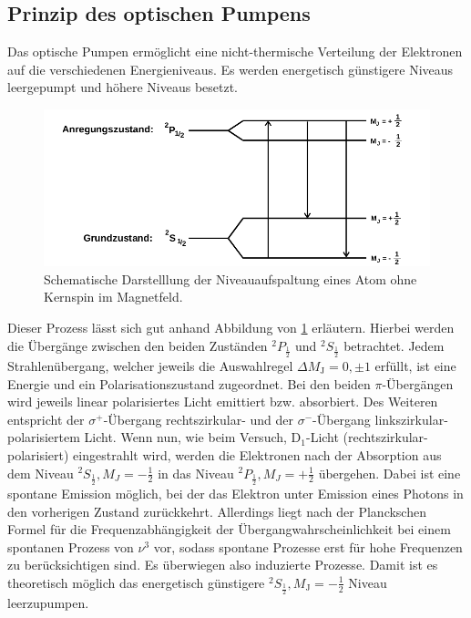 \subsection{Prinzip des optischen Pumpens}
Das optische Pumpen ermöglicht eine nicht-thermische Verteilung der
Elektronen auf die verschiedenen Energieniveaus. Es werden energetisch
günstigere Niveaus leergepumpt und höhere Niveaus besetzt.
\begin{figure}
  \centering
  \includegraphics[width=0.9\columnwidth]{pictures/niveaus.png}
  \caption{Schematische Darstelllung der Niveauaufspaltung eines Atom ohne Kernspin im Magnetfeld.\cite{Anleitung}}
  \label{fig:übergaenge_alkali}
\end{figure}
Dieser Prozess lässt sich gut anhand Abbildung von \ref{fig:übergaenge_alkali}
erläutern.
Hierbei werden die Übergänge zwischen den beiden Zuständen $^2P_{\frac{1}{2}}$ und $^2S_{\frac{1}{2}}$ betrachtet.
Jedem Strahlenübergang, welcher jeweils die Auswahlregel $\Delta M_{\mathrm{J}} = 0, \pm 1$ erfüllt, ist eine Energie und ein Polarisationszustand zugeordnet.
Bei den beiden $\pi$-Übergängen wird jeweils linear polarisiertes Licht
emittiert bzw. absorbiert. Des Weiteren entspricht der $\sigma^+$-Übergang
rechtszirkular- und der $\sigma^-$-Übergang linkszirkular-polarisiertem Licht.
Wenn nun, wie beim Versuch, D$_1$-Licht (rechtszirkular-polarisiert)
eingestrahlt wird, werden die Elektronen nach der Absorption aus
dem Niveau $^2S_{\frac{1}{2}}, M_J = -\frac{1}{2}$ in das Niveau
$^2P_{\frac{1}{2}}, M_J = +\frac{1}{2}$ übergehen. Dabei ist eine
spontane Emission möglich, bei der das Elektron unter Emission eines
Photons in den vorherigen Zustand zurückkehrt. Allerdings liegt nach
der Planckschen Formel für die Frequenzabhängigkeit der
Übergangwahrscheinlichkeit bei einem spontanen Prozess von $\nu^3$ vor, sodass
spontane Prozesse erst für hohe Frequenzen zu berücksichtigen sind.
Es überwiegen also induzierte Prozesse. Damit ist es theoretisch möglich
das energetisch günstigere  $^2S_{\frac{1}{2}}, M_{\mathrm{J}} = -\frac{1}{2}$ Niveau leerzupumpen.

